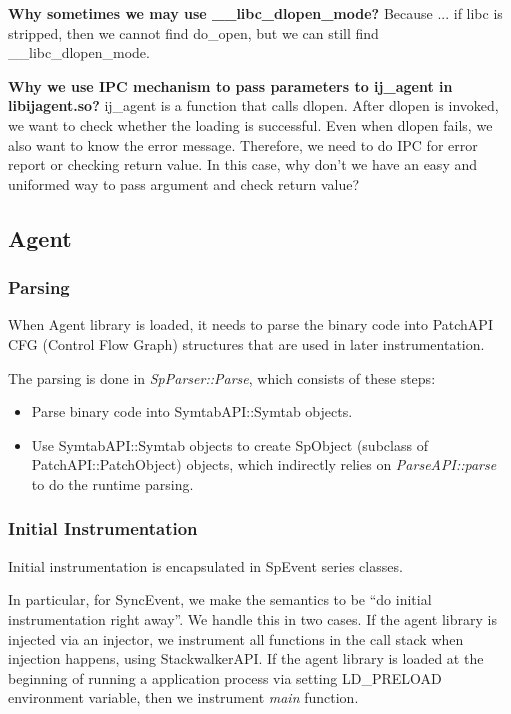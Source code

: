 \textbf{Why sometimes we may use \_\_libc\_dlopen\_mode?} Because ... if libc is
stripped, then we cannot find do\_open, but we can still find
\_\_libc\_dlopen\_mode.


\textbf{Why we use IPC mechanism to pass parameters to ij\_agent in
  libijagent.so?}  ij\_agent is a function that calls dlopen. After dlopen is
invoked, we want to check whether the loading is successful. Even when dlopen
fails, we also want to know the error message. Therefore, we need to do IPC for
error report or checking return value. In this case, why don't we have an easy
and uniformed way to pass argument and check return value?

\subsection{Agent}
\subsubsection{Parsing}

When Agent library is loaded, it needs to parse the binary code into PatchAPI
CFG (Control Flow Graph) structures that are used in later instrumentation.

The parsing is done in {\em SpParser::Parse}, which consists of these steps:
\begin{itemize}
\item Parse binary code into SymtabAPI::Symtab objects.
\item Use SymtabAPI::Symtab objects to create SpObject (subclass of
  PatchAPI::PatchObject) objects, which indirectly relies on {\em
    ParseAPI::parse} to do the runtime parsing.
\end{itemize}

\subsubsection{Initial Instrumentation}

Initial instrumentation is encapsulated in SpEvent series classes. 

In particular, for SyncEvent, we make the semantics to be ``do initial
instrumentation right away''. We handle this in two cases. If the agent library
is injected via an injector, we instrument all functions in the call stack when
injection happens, using StackwalkerAPI. If the agent library is loaded at the
beginning of running a application process via setting LD\_PRELOAD environment
variable, then we instrument {\em main} function.


